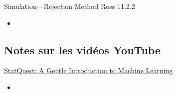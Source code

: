 \begin{CHPT_SUMM_AUTO_NUMB}[label = {L.-24}]{Simulation---Rejection Method}
Ross 11.2.2
	\begin{itemize}
		\item	
	\end{itemize}
\end{CHPT_SUMM_AUTO_NUMB}

\subsection{Notes sur les vidéos YouTube}

\begin{YTB_SUMM}[label = {SQ-BASICS-ML-INTRO}]{\href{https://www.youtube.com/watch?v=Gv9_4yMHFhI&list=PLblh5JKOoLUICTaGLRoHQDuF_7q2GfuJF&index=2&t=0s}{StatQuest: A Gentle Introduction to Machine Learning}}
\begin{itemize}
	\item	
\end{itemize}
\end{YTB_SUMM}